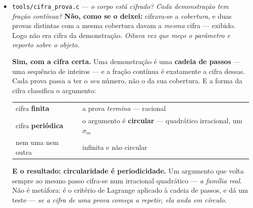 \documentclass[11pt]{article}
\newcommand{\code}[1]{\texttt{\small #1}}
\theoremstyle{plain}
\theoremstyle{remark}
\begin{document}
\begin{itemize}
E um resultado que não é trivialidade: \textbf{contrapor não aumenta a cobertura} --- quem prova
$\neg B \to \neg A$ prova \emph{exatamente} o que provou de $A \to B$, nem mais um caso. A
contraposição muda a \emph{forma} da afirmação e não a \emph{medida} da verificação. \emph{Logo não
serve para tapar lacuna --- e usou-se-a hoje como se servisse}, quando disse ``não é ordenável,
\emph{logo} recusa''.

\textbf{Para que serve} --- que era a pergunta: para o quanto se provou ser um \emph{número} com
regra de composição. A cadeia \textbf{multiplica} (um elo decretado leva tudo a zero, por mais
medida à volta); as partes disjuntas \textbf{somam} (e a conta fecha exatamente quando cobrem o
todo); e o excesso tem \textbf{sinal} e subtrai-se. \emph{Os seis erros deste dia teriam sido
apanhados por esta conta antes de se os escrever} --- nenhum tinha cobertura $1$, e todos foram
anunciados como $1$.
\item \code{tools/cifra\_prova.c} --- \emph{o corpo está cifrado? Cada demonstração tem
fração contínua?} \textbf{Não, como se o deixei:} cifrava-se a \emph{cobertura}, e duas provas
distintas com a mesma cobertura davam a \emph{mesma} cifra --- exibido. Logo não era cifra da
demonstração. \emph{Oitava vez que meço o parâmetro e reporto sobre o objeto.}

\textbf{Sim, com a cifra certa.} Uma demonstração é uma \textbf{cadeia de passos} --- uma sequência
de inteiros --- e a fração contínua é exatamente a cifra dessas. Cada prova passa a ter o
\emph{seu} número, não o da sua cobertura. E a forma da cifra classifica o argumento:

\begin{center}\begin{tabular}{ll}
cifra \textbf{finita} & a prova \emph{termina} --- racional \\
cifra \textbf{periódica} & o argumento é \textbf{circular} --- quadrático irracional, um $\sigma_m$ \\
nem uma nem outra & infinita e não circular \\
\end{tabular}\end{center}

\textbf{E o resultado: circularidade é periodicidade.} Um argumento que volta sempre ao mesmo
passo cifra-se num irracional quadrático --- \emph{a família real}. Não é metáfora: é o critério de
Lagrange aplicado à cadeia de passos, e dá um teste --- \emph{se a cifra de uma prova começa a
repetir, ela anda em círculo}.


\end{itemize}
\end{document}
